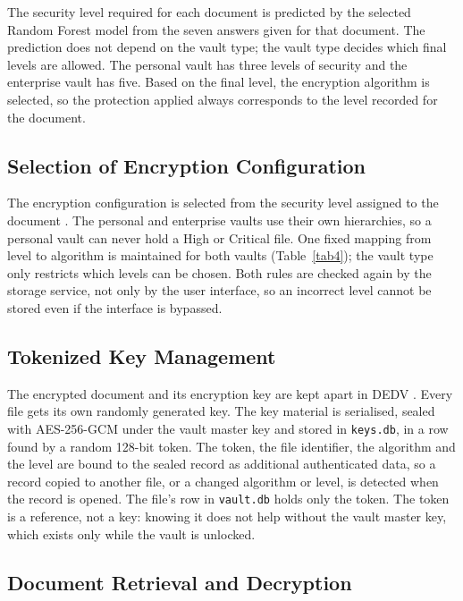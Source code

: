 \documentclass[pdflatex,sn-mathphys-num]{sn-jnl}
\newcommand{\code}[1]{\texttt{#1}}
\begin{document}
The security level required for each document is predicted by the selected Random Forest model
from the seven answers given for that document. The prediction does not depend on the vault type;
the vault type decides which final levels are allowed. The personal vault has three levels of
security and the enterprise vault has five. Based on the final level, the encryption algorithm is
selected, so the protection applied always corresponds to the level recorded for the document.

\subsection{Selection of Encryption Configuration}

The encryption configuration is selected from the security level assigned to the document
\cite{sasikumar2025enhancing}. The personal and enterprise vaults use their own hierarchies, so a
personal vault can never hold a High or Critical file. One fixed mapping from level to algorithm
is maintained for both vaults (Table~\ref{tab4}); the vault type only restricts which levels can
be chosen. Both rules are checked again by the storage service, not only by the user interface,
so an incorrect level cannot be stored even if the interface is bypassed.

\subsection{Tokenized Key Management}

The encrypted document and its encryption key are kept apart in DEDV
\cite{rana2023comprehensive}. Every file gets its own randomly generated key. The key material is
serialised, sealed with AES-256-GCM under the vault master key and stored in \code{keys.db}, in a
row found by a random 128-bit token. The token, the file identifier, the algorithm and the level
are bound to the sealed record as additional authenticated data, so a record copied to another
file, or a changed algorithm or level, is detected when the record is opened. The file's row in
\code{vault.db} holds only the token. The token is a reference, not a key: knowing it does not
help without the vault master key, which exists only while the vault is unlocked.

\subsection{Document Retrieval and Decryption}
\end{document}

